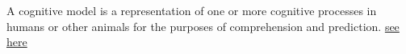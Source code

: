 \documentclass[a4paper]{article}
\title{}
\date{}
\newcommand{\seehere}[1]{\href{#1}{see here}}
\begin{document}
    \maketitle
    A cognitive model is a representation of one or more cognitive processes in humans or other animals for the purposes of comprehension and prediction.
    \seehere{https://en.wikipedia.org/wiki/Cognitive_model}
\end{document}
